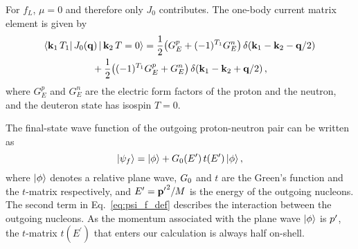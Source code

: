 	For $f_L$, $\mu = 0$ and therefore only $J_0$ contributes.
	The one-body current matrix element is given by
	\begin{multline}
	 \la \mbf{k}_1 \, T_1| \, J_0(\mbf{q}) \, | \,\mbf{k}_2 \, T=0 \ra
	 = \frac{1}{2} \big(G_E^p + (-1)^{T_1} G_E^n\big) \,
	 \delta(\mbf{k}_1 - \mbf{k}_2 - \mbf{q}/2) \\
	 \null + \frac{1}{2} \big((-1)^{T_1} G_E^p +  G_E^n\big) \, \delta(\mbf{k}_1
	 - \mbf{k}_2 + \mbf{q}/2) \,,
	\label{eq:J0_def}
	\end{multline}
	where $G_E^p$ and $G_E^n$ are the electric form factors of the proton and the
	neutron, and the deuteron state has isospin $T=0$.

	The final-state wave function of the outgoing proton-neutron pair can be
	written	as
	\begin{equation}
	 |\psi_f\rangle = | \phi \rangle + G_0 (E^\prime) \, t(E^\prime) \,| \phi \rangle \,,
	\label{eq:psi_f_def}
	\end{equation}
	where ${|\phi\rangle}$ denotes a relative plane wave, $G_0$ and $t$
	are the Green's function and the $t$-matrix respectively, and  $E^\prime =
	\mathbf{p^\prime}^2/M$ is the energy of the outgoing nucleons.  The second term in
	Eq.~\eqref{eq:psi_f_def} describes the interaction between the outgoing
	nucleons.  As the momentum associated with the plane wave ${|\phi\rangle}$ is
	$p^\prime$, the $t$-matrix $t(E^\prime)$ that enters our calculation is always
	half on-shell.

